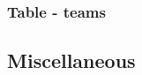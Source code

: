 \documentclass[12pt]{report}
\begin{document}
\subsubsection{Table - teams} \label{data-layer.design.team-system.teams}



\subsection{Miscellaneous}












\end{document}
